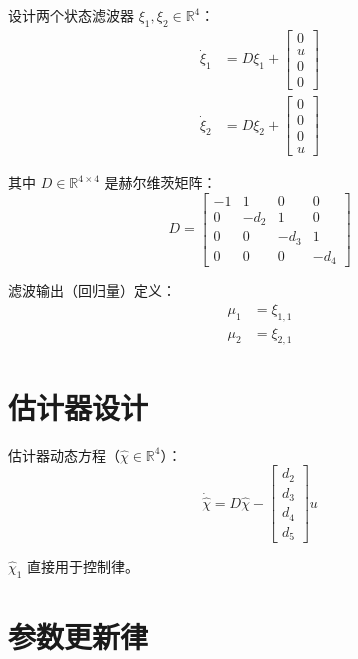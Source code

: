 \documentclass[12pt,a4paper]{article}
\begin{document}
设计两个状态滤波器 $\xi_1, \xi_2 \in \mathbb{R}^4$：
\begin{align}
\dot{\xi}_1 &= D\xi_1 +
\begin{bmatrix}
0 \\ u \\ 0 \\ 0
\end{bmatrix} \label{eq:xi1} \\
\dot{\xi}_2 &= D\xi_2 +
\begin{bmatrix}
0 \\ 0 \\ 0 \\ u
\end{bmatrix} \label{eq:xi2}
\end{align}

其中 $D \in \mathbb{R}^{4\times4}$ 是赫尔维茨矩阵：
\begin{equation}
D =
\begin{bmatrix}
-1 & 1 & 0 & 0 \\
0 & -d_2 & 1 & 0 \\
0 & 0 & -d_3 & 1 \\
0 & 0 & 0 & -d_4
\end{bmatrix}
\label{eq:D}
\end{equation}

滤波输出（回归量）定义：
\begin{align}
\mu_1 &= \xi_{1,1} \label{eq:mu1} \\
\mu_2 &= \xi_{2,1} \label{eq:mu2}
\end{align}

\section{估计器设计}

估计器动态方程（$\hat{\chi} \in \mathbb{R}^4$）：
\begin{equation}
\dot{\hat{\chi}} = D\hat{\chi} -
\begin{bmatrix}
d_2 \\ d_3 \\ d_4 \\ d_5
\end{bmatrix} u
\label{eq:chi}
\end{equation}

$\hat{\chi}_1$ 直接用于控制律。

\section{参数更新律}
\end{document}
